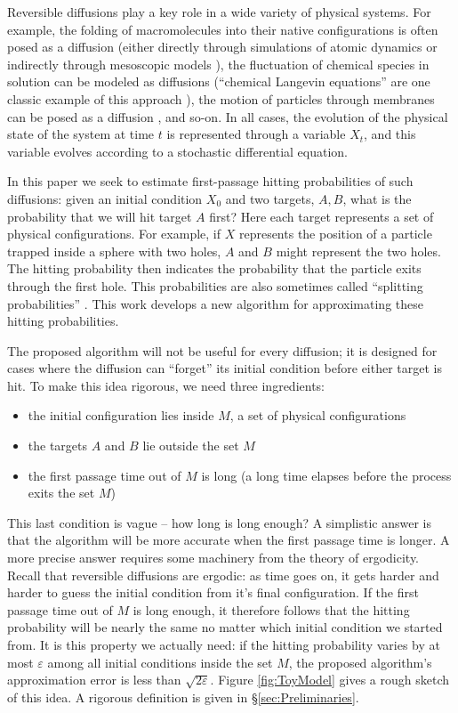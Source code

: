 \documentclass[12pt, nofootinbib,english, amsmath, amssymb, aps, priprint, graphicx,floatfix]{revtex4-1}
\theoremstyle{plain}
\theoremstyle{definition}
\theoremstyle{plain}
\begin{document}
Reversible diffusions play a key role in a wide variety of physical systems.  For example, the folding of macromolecules into their native configurations is often posed as a diffusion (either directly through simulations of atomic dynamics or indirectly through mesoscopic models \cite{Scheraga2007-qw,Hospital2015-ol,lei2010direct}), the fluctuation of chemical species in solution can be modeled as diffusions (``chemical Langevin equations'' are one classic example of this approach \cite{sotiropoulos2011analytical,gillespie2000chemical}), the motion of particles through membranes can be posed as a diffusion \cite{holcman2004escape}, and so-on.   In all cases, the evolution of the physical state of the system at time $t$ is represented through a variable $X_t$, and this variable evolves according to a stochastic differential equation.

In this paper we seek to estimate first-passage hitting probabilities of such diffusions: given an initial condition $X_0$ and two targets, $A,B$, what is the probability that we will hit target $A$ first?   Here each target represents a set of physical configurations.  For example, if $X$ represents the position of a particle trapped inside a sphere with two holes, $A$ and $B$ might represent the two holes.  The hitting probability then indicates the probability that the particle exits through the first hole.  This probabilities are also sometimes called ``splitting probabilities'' \cite{E2006-fm}.  This work develops a new algorithm for approximating these hitting probabilities.  

The proposed algorithm will not be useful for every diffusion; it is designed for cases where the diffusion can ``forget'' its initial condition before either target is hit.  To make this idea rigorous, we need three ingredients:
\begin{itemize}
    \item the initial configuration lies inside $M$, a set of physical configurations
    \item the targets $A$ and $B$ lie outside the set $M$
    \item the first passage time out of $M$ is long (a long time elapses before the process exits the set $M$)
\end{itemize}
This last condition is vague -- how long is long enough?  A simplistic answer is that the algorithm will be more accurate when the first passage time is longer.  A more precise answer requires some machinery from the theory of ergodicity.  Recall that reversible diffusions are ergodic: as time goes on, it gets harder and harder to guess the initial condition from it's final configuration.  If the first passage time out of $M$ is long enough, it therefore follows that the hitting probability will be nearly the same no matter which initial condition we started from.  It is this property we actually need: if the hitting probability varies by at most $\varepsilon$ among all initial conditions inside the set $M$, the proposed algorithm's approximation error is less than $\sqrt{2\varepsilon}$.  Figure \ref{fig:ToyModel} gives a rough sketch of this idea.  A rigorous definition is given in  \S\ref{sec:Preliminaries}.  
\end{document}
